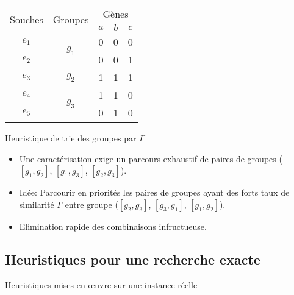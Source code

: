 \documentclass{beamer}
\begin{document}
\begin{frame}
				\begin{center}
					\begin{tabular}{|c||c|c|c|c|}
						\hline
						\multirow{2}{*}{Souches}&\multirow{2}{*}{Groupes}&\multicolumn{3}{c|}{Gènes
						}\\
						&&$a$&$b$&$c$\\
						\hline
						\hline
						$e_1$&\multirow{2}{*}{$g_1$}& 0 & 0 & 0\\
						\cline{1-1} \cline{3-5}
						$e_2$&& 0 & 0 & 1\\
						\hline
						\hline
						$e_3$&$g_2$& 1 &  1 & 1\\
						\hline
						\hline
						$e_4$&\multirow{2}{*}{$g_3$}& 1 & 1 & 0\\
						\cline{1-1} \cline{3-5}
						$e_5$&& 0 & 1 & 0\\
						\hline
					\end{tabular}
				\end{center}
				\begin{block}{Heuristique de trie des groupes par $\Gamma$}
					\begin{itemize}
					\item Une caractérisation exige un parcours exhaustif de paires de groupes ($[g_1,g_2]$, $[g_1,g_3]$, $[g_2,g_3]$).
					\pause
					\item Idée: Parcourir en priorités les paires de groupes ayant des forts taux de similarité $\Gamma$ entre groupe ($[g_2,g_3]$, $[g_3,g_1]$, $[g_1,g_2]$).
					\pause
					\item Elimination rapide des combinaisons infructueuse.
					\end{itemize}
				\end{block}
\end{frame}

\subsection{Heuristiques pour une recherche exacte}
\begin{frame}{Heuristiques mises en \oe uvre sur une instance réelle}
	
\end{frame}

%	
\end{document}
